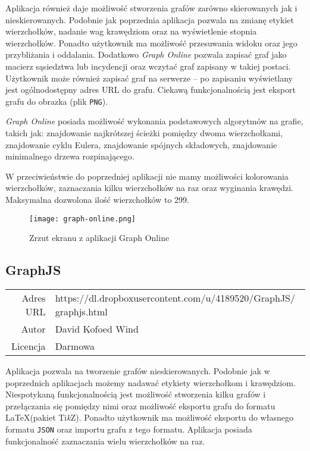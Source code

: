 Aplikacja również daje możliwość stworzenia grafów zarówno skierowanych jak i nieskierowanych. Podobnie jak poprzednia aplikacja pozwala na zmianę etykiet wierzchołków, nadanie wag krawędziom oraz na wyświetlenie stopnia wierzchołków. Ponadto użytkownik ma możliwość przesuwania widoku oraz jego przybliżania i oddalania. Dodatkowo \textit{Graph Online} pozwala zapisać graf jako macierz sąsiedztwa lub incydencji oraz wczytać graf zapisany w takiej postaci. Użytkownik może również zapisać graf na serwerze -- po zapisaniu wyświetlany jest ogólnodostępny adres URL do grafu. Ciekawą funkcjonalnością jest eksport grafu do obrazka (plik \texttt{PNG}).

\textit{Graph Online} posiada możliwość wykonania podstawowych algorytmów na grafie, takich jak: znajdowanie najkrótszej ścieżki pomiędzy dwoma wierzchołkami, znajdowanie cyklu Eulera, znajdowanie spójnych składowych, znajdowanie minimalnego drzewa rozpinającego.  

W przeciwieństwie do poprzedniej aplikacji nie mamy możliwości kolorowania wierzchołków, zaznaczania kilku wierzchołków na raz oraz wyginania krawędzi. Maksymalna dozwolona ilość wierzchołków to 299. 

\begin{figure}[H]
\caption{Zrzut ekranu z aplikacji Graph Online}
\centering
\texttt{[image: graph-online.png]}
\end{figure}

\subsection*{GraphJS}
\bigskip
\noindent\begin{tabularx}{\textwidth}{r|X|}
\cline{2-2}
  Adres URL & https://dl.dropboxusercontent.com/u/4189520/GraphJS/ graphjs.html \\ 
\cline{2-2} 
 Autor & David Kofoed Wind \\ 
\cline{2-2}
 Licencja & Darmowa\\  
\cline{2-2}
\end{tabularx}
\bigskip

Aplikacja pozwala na tworzenie grafów nieskierowanych. Podobnie jak w poprzednich aplikacjach możemy nadawać etykiety wierzchołkom i krawędziom. Niespotykaną funkcjonalnością jest możliwość stworzenia kilku grafów i przełączania się pomiędzy nimi oraz możliwość eksportu grafu do formatu \LaTeX (pakiet Ti\textit{k}Z). Ponadto użytkownik ma możliwość eksportu do własnego formatu \texttt{JSON} oraz importu grafu z tego formatu. Aplikacja posiada funkcjonalność zaznaczania wielu wierzchołków na raz.

